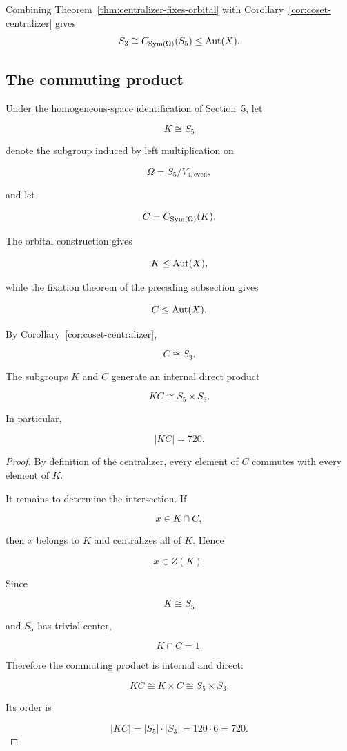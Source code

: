 Combining Theorem~\ref{thm:centralizer-fixes-orbital} with
Corollary~\ref{cor:coset-centralizer} gives
\[
S_3
\cong
C_{\operatorname{Sym}(\Omega)}(S_5)
\leq
\operatorname{Aut}(X).
\]

\subsection{The commuting product}


Under the homogeneous-space identification of Section~5, let

\[
K\cong S_{5}
\]

denote the subgroup induced by left multiplication on

\[
\Omega=S_{5}/V_{4,\mathrm{even}},
\]

and let

\[
C=C_{\operatorname{Sym}(\Omega)}(K).
\]

The orbital construction gives

\[
K\leq\operatorname{Aut}(X),
\]

while the fixation theorem of the preceding subsection gives

\[
C\leq\operatorname{Aut}(X).
\]

By Corollary~\ref{cor:coset-centralizer},

\[
C\cong S_{3}.
\]

\begin{proposition}
\label{prop:commuting-product}

The subgroups \(K\) and \(C\) generate an internal direct product

\[
KC
\cong
S_{5}\times S_{3}.
\]

In particular,

\[
|KC|=720.
\]

\end{proposition}

\begin{proof}

By definition of the centralizer, every element of \(C\) commutes with
every element of \(K\).

It remains to determine the intersection. If

\[
x\in K\cap C,
\]

then \(x\) belongs to \(K\) and centralizes all of \(K\). Hence

\[
x\in Z(K).
\]

Since

\[
K\cong S_{5}
\]

and \(S_{5}\) has trivial center,

\[
K\cap C=1.
\]

Therefore the commuting product is internal and direct:

\[
KC
\cong
K\times C
\cong
S_{5}\times S_{3}.
\]

Its order is

\[
|KC|
=
|S_{5}|\cdot|S_{3}|
=
120\cdot6
=
720.
\]
\end{proof}

